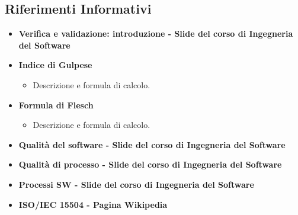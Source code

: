 \documentclass[PianoDiQualifica.tex]{subfiles}
\begin{document}
		\subsection{Riferimenti Informativi}
		\begin{itemize}
			\item \textbf{Verifica e validazione: introduzione - Slide del corso di Ingegneria del Software}\\
			\item \textbf{Indice di Gulpese}\\
			\begin{itemize}
				\item Descrizione e formula di calcolo.
			\end{itemize}
			\item \textbf{Formula di Flesch}\\
			\begin{itemize}
				\item Descrizione e formula di calcolo.
			\end{itemize}
			\item \textbf{Qualità del software - Slide del corso di Ingegneria del Software}\\
			\item \textbf{Qualità di processo - Slide del corso di Ingegneria del Software}\\
			\item \textbf{Processi SW - Slide del corso di Ingegneria del Software}\\
			\item \textbf{ISO/IEC 15504 - Pagina Wikipedia}\\
		\end{itemize}
	
\end{document}
